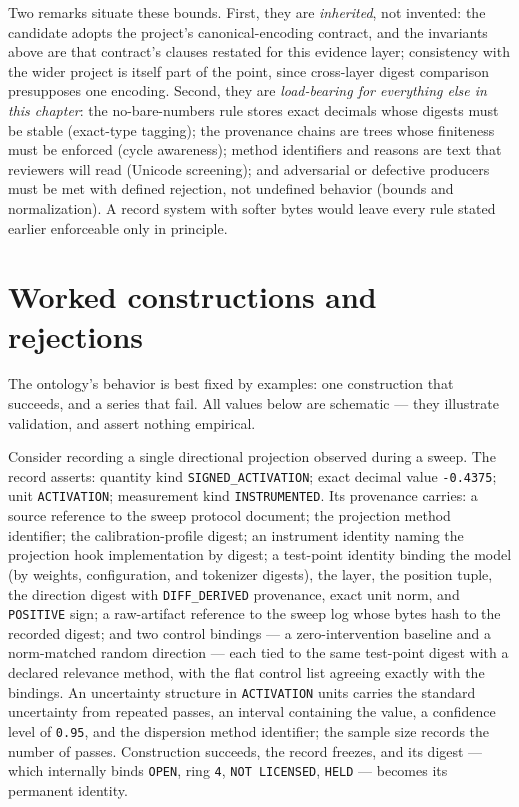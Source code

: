 Two remarks situate these bounds. First, they are \emph{inherited}, not invented: the candidate adopts the project's canonical-encoding contract, and the invariants above are that contract's clauses restated for this evidence layer; consistency with the wider project is itself part of the point, since cross-layer digest comparison presupposes one encoding. Second, they are \emph{load-bearing for everything else in this chapter}: the no-bare-numbers rule stores exact decimals whose digests must be stable (exact-type tagging); the provenance chains are trees whose finiteness must be enforced (cycle awareness); method identifiers and reasons are text that reviewers will read (Unicode screening); and adversarial or defective producers must be met with defined rejection, not undefined behavior (bounds and normalization). A record system with softer bytes would leave every rule stated earlier enforceable only in principle.

\section{Worked constructions and rejections}\label{ch03:worked}

The ontology's behavior is best fixed by examples: one construction that succeeds, and a series that fail. All values below are schematic --- they illustrate validation, and assert nothing empirical.

\begin{example}\label{ch03:ex:valid}
Consider recording a single directional projection observed during a sweep. The record asserts: quantity kind \texttt{SIGNED\_ACTIVATION}; exact decimal value \texttt{-0.4375}; unit \texttt{ACTIVATION}; measurement kind \texttt{INSTRUMENTED}. Its provenance carries: a source reference to the sweep protocol document; the projection method identifier; the calibration-profile digest; an instrument identity naming the projection hook implementation by digest; a test-point identity binding the model (by weights, configuration, and tokenizer digests), the layer, the position tuple, the direction digest with \texttt{DIFF\_DERIVED} provenance, exact unit norm, and \texttt{POSITIVE} sign; a raw-artifact reference to the sweep log whose bytes hash to the recorded digest; and two control bindings --- a zero-intervention baseline and a norm-matched random direction --- each tied to the same test-point digest with a declared relevance method, with the flat control list agreeing exactly with the bindings. An uncertainty structure in \texttt{ACTIVATION} units carries the standard uncertainty from repeated passes, an interval containing the value, a confidence level of \texttt{0.95}, and the dispersion method identifier; the sample size records the number of passes. Construction succeeds, the record freezes, and its digest --- which internally binds \texttt{OPEN}, ring \texttt{4}, \texttt{NOT LICENSED}, \texttt{HELD} --- becomes its permanent identity.
\end{example}


